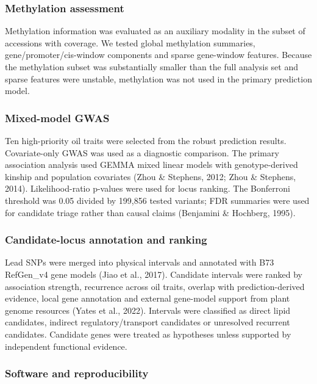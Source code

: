 \documentclass[
]{article}
\begin{document}
\subsubsection{Methylation assessment}\label{methylation-assessment}

Methylation information was evaluated as an auxiliary modality in the
subset of accessions with coverage. We tested global methylation
summaries, gene/promoter/cis-window components and sparse gene-window
features. Because the methylation subset was substantially smaller than
the full analysis set and sparse features were unstable, methylation was
not used in the primary prediction model.

\subsubsection{Mixed-model GWAS}\label{mixed-model-gwas}

Ten high-priority oil traits were selected from the robust prediction
results. Covariate-only GWAS was used as a diagnostic comparison. The
primary association analysis used GEMMA mixed linear models with
genotype-derived kinship and population covariates (Zhou \& Stephens,
2012; Zhou \& Stephens, 2014). Likelihood-ratio p-values were used for
locus ranking. The Bonferroni threshold was 0.05 divided by 199,856
tested variants; FDR summaries were used for candidate triage rather
than causal claims (Benjamini \& Hochberg, 1995).

\subsubsection{Candidate-locus annotation and
ranking}\label{candidate-locus-annotation-and-ranking}

Lead SNPs were merged into physical intervals and annotated with B73
RefGen\_v4 gene models (Jiao et al., 2017). Candidate intervals were
ranked by association strength, recurrence across oil traits, overlap
with prediction-derived evidence, local gene annotation and external
gene-model support from plant genome resources (Yates et al., 2022).
Intervals were classified as direct lipid candidates, indirect
regulatory/transport candidates or unresolved recurrent candidates.
Candidate genes were treated as hypotheses unless supported by
independent functional evidence.

\subsubsection{Software and
reproducibility}\label{software-and-reproducibility}
\end{document}
